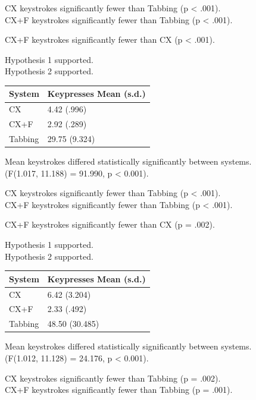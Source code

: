 \documentclass[11pt,openright,a4paper]{report}
\begin{document}
CX keystrokes significantly fewer than Tabbing (p < .001).\\
CX+F keystrokes significantly fewer than Tabbing (p < .001).

CX+F keystrokes significantly fewer than CX (p < .001).

Hypothesis 1 supported.\\
Hypothesis 2 supported.

\begin{tabular}{l l}
\hline\hline %
System & Keypresses Mean (s.d.) \\ [0.5ex] %
\hline %
CX & 4.42 (.996)\\
CX+F & 2.92 (.289)\\
Tabbing & 29.75 (9.324)\\ [1ex] %
\hline %
\end{tabular}

Mean keystrokes differed statistically significantly between systems.\\
(F(1.017, 11.188) = 91.990, p < 0.001).

CX keystrokes significantly fewer than Tabbing (p < .001).\\
CX+F keystrokes significantly fewer than Tabbing (p < .001).

CX+F keystrokes significantly fewer than CX (p = .002).

Hypothesis 1 supported.\\
Hypothesis 2 supported.

\begin{tabular}{l l}
\hline\hline %
System & Keypresses Mean (s.d.) \\ [0.5ex] %
\hline %
CX & 6.42 (3.204)\\
CX+F & 2.33 (.492)\\
Tabbing & 48.50 (30.485)\\ [1ex] %
\hline %
\end{tabular}

Mean keystrokes differed statistically significantly between systems.\\
(F(1.012, 11.128) = 24.176, p < 0.001).

CX keystrokes significantly fewer than Tabbing (p = .002).\\
CX+F keystrokes significantly fewer than Tabbing (p = .001).
\end{document}
